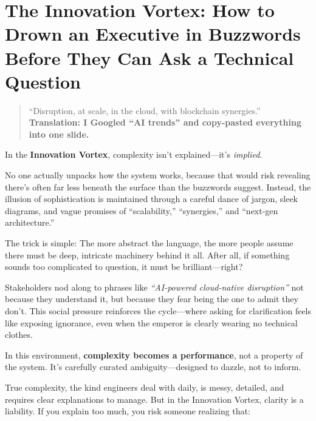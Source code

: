 \section{The Innovation Vortex: How to Drown an Executive in Buzzwords Before They Can Ask a Technical Question}

\begin{quote}
“Disruption, at scale, in the cloud, with blockchain synergies.” \textbf{\small Translation: I Googled “AI trends” and copy-pasted everything into one slide.}
\end{quote}


In the \textbf{Innovation Vortex}, complexity isn’t explained—it’s \textit{implied}.

No one actually unpacks how the system works, because that would risk revealing there’s often far less beneath the surface than the buzzwords suggest. Instead, the illusion of sophistication is maintained through a careful dance of jargon, sleek diagrams, and vague promises of ``scalability,'' ``synergies,'' and ``next-gen architecture.''

The trick is simple: The more abstract the language, the more people assume there must be deep, intricate machinery behind it all. After all, if something sounds too complicated to question, it must be brilliant—right?

Stakeholders nod along to phrases like \textit{``AI-powered cloud-native disruption''} not because they understand it, but because they fear being the one to admit they don’t. This social pressure reinforces the cycle—where asking for clarification feels like exposing ignorance, even when the emperor is clearly wearing no technical clothes.

In this environment, \textbf{complexity becomes a performance}, not a property of the system.  It's carefully curated ambiguity—designed to dazzle, not to inform.

True complexity, the kind engineers deal with daily, is messy, detailed, and requires clear explanations to manage. But in the Innovation Vortex, clarity is a liability. If you explain too much, you risk someone realizing that:

